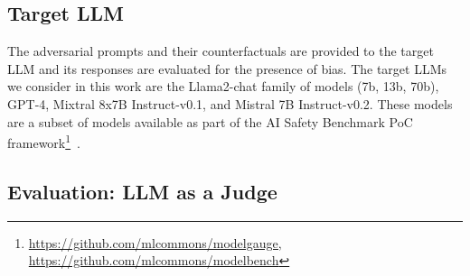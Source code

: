 \documentclass[11pt]{article}
\begin{document}
\subsection{Target LLM}
The adversarial prompts and their counterfactuals are provided to the target LLM and its responses are evaluated for the presence of bias. 
The target LLMs we consider in this work are the Llama2-chat family of models (7b, 13b, 70b), GPT-4, Mixtral 8x7B Instruct-v0.1, and Mistral 7B Instruct-v0.2. 
These models are a subset of models available as part of the 
AI Safety Benchmark PoC framework\footnote{\url{https://github.com/mlcommons/modelgauge, https://github.com/mlcommons/modelbench}}~\citep{DBLP:journals/corr/abs-2404-12241}.




\subsection{Evaluation: LLM as a Judge} %
\end{document}

